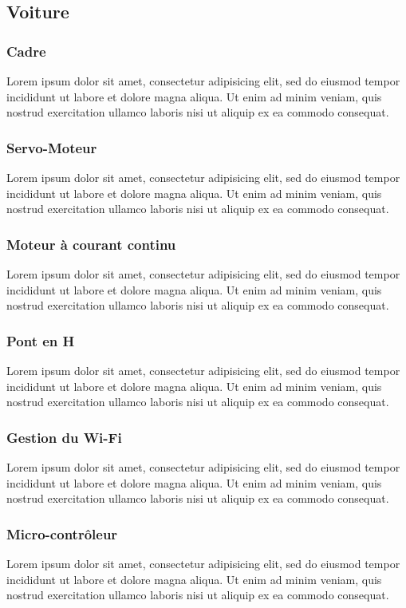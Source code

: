 \documentclass[a4paper,12pt]{report}
\begin{document}
		\subsection{Voiture}
		
			\subsubsection{Cadre}
			Lorem ipsum dolor sit amet, consectetur adipisicing elit, sed do eiusmod tempor incididunt ut labore et dolore magna aliqua. Ut enim ad minim veniam, quis nostrud exercitation ullamco laboris nisi ut aliquip ex ea commodo consequat.
			
			\subsubsection{Servo-Moteur}
			Lorem ipsum dolor sit amet, consectetur adipisicing elit, sed do eiusmod tempor incididunt ut labore et dolore magna aliqua. Ut enim ad minim veniam, quis nostrud exercitation ullamco laboris nisi ut aliquip ex ea commodo consequat.
			
			\subsubsection{Moteur à courant continu}
			Lorem ipsum dolor sit amet, consectetur adipisicing elit, sed do eiusmod tempor incididunt ut labore et dolore magna aliqua. Ut enim ad minim veniam, quis nostrud exercitation ullamco laboris nisi ut aliquip ex ea commodo consequat.
			
			\subsubsection{Pont en H}
			Lorem ipsum dolor sit amet, consectetur adipisicing elit, sed do eiusmod tempor incididunt ut labore et dolore magna aliqua. Ut enim ad minim veniam, quis nostrud exercitation ullamco laboris nisi ut aliquip ex ea commodo consequat.
			
			\subsubsection{Gestion du Wi-Fi}
			Lorem ipsum dolor sit amet, consectetur adipisicing elit, sed do eiusmod tempor incididunt ut labore et dolore magna aliqua. Ut enim ad minim veniam, quis nostrud exercitation ullamco laboris nisi ut aliquip ex ea commodo consequat.
			
			\subsubsection{Micro-contrôleur}
			Lorem ipsum dolor sit amet, consectetur adipisicing elit, sed do eiusmod tempor incididunt ut labore et dolore magna aliqua. Ut enim ad minim veniam, quis nostrud exercitation ullamco laboris nisi ut aliquip ex ea commodo consequat.
			
\end{document}
